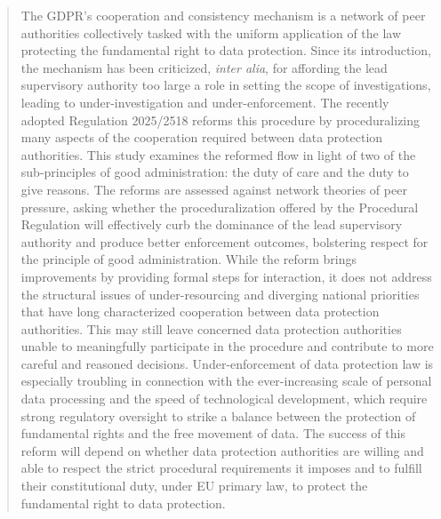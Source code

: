 \begin{abstract}
The GDPR's cooperation and consistency mechanism is a network of peer authorities collectively tasked with the uniform application of the law protecting the fundamental right to data protection. 
Since its introduction, the mechanism has been criticized, \emph{inter alia}, for affording the lead supervisory authority too large a role in setting the scope of investigations, leading to under-investigation and under-enforcement. 
The recently adopted Regulation 2025/2518 reforms this procedure by proceduralizing many aspects of the cooperation required between data protection authorities. This study examines the reformed flow in light of two of the sub-principles of good administration: the duty of care and the duty to give reasons. 
The reforms are assessed against network theories of peer pressure, asking whether the proceduralization offered by the Procedural Regulation will effectively curb the dominance of the lead supervisory authority and produce better enforcement outcomes, bolstering respect for the principle of good administration. 
While the reform brings improvements by providing formal steps for interaction, it does not address the structural issues of under-resourcing and diverging national priorities that have long characterized cooperation between data protection authorities. 
This may still leave concerned data protection authorities unable to meaningfully participate in the procedure and contribute to more careful and reasoned decisions. 
Under-enforcement of data protection law is especially troubling in connection with the ever-increasing scale of personal data processing and the speed of technological development, which require strong regulatory oversight to strike a balance between the protection of fundamental rights and the free movement of data. 
The success of this reform will depend on whether data protection authorities are willing and able to respect the strict procedural requirements it imposes and to fulfill their constitutional duty, under EU primary law, to protect the fundamental right to data protection.
\end{abstract}